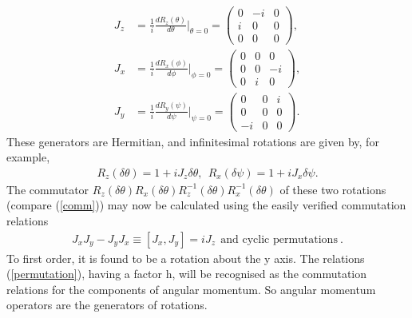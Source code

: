 \documentclass[12pt,a4paper]{report}
\begin{document}
\begin{align}
    J_z&=\frac{1}{i}\frac{dR_z(\theta)}{d\theta}\Bigr|_{\theta=0}=\begin{pmatrix}
    0&-i&0\\
    i&0&0\\
    0&0&0
\end{pmatrix},\\
   J_x&=\frac{1}{i}\frac{dR_x(\phi)}{d\phi}\Bigr|_{\phi=0}=\begin{pmatrix}
    0&0&0\\
    0&0&-i\\
    0&i&0
\end{pmatrix},\\
J_y&=\frac{1}{i}\frac{dR_y(\psi)}{d\psi}\Bigr|_{\psi=0}=\begin{pmatrix}
    0&0&i\\
    0&0&0\\
    -i&0&0
\end{pmatrix}.\label{2.31}
\end{align}
These generators are Hermitian, and infinitesimal rotations are given by, for example, 
\begin{align}
    R_z(\delta\theta)=1+iJ_z\delta\theta,~~R_x(\delta\psi)=1+iJ_x\delta\psi.
\end{align}
The commutator $R_z(\delta\theta)R_x(\delta\theta)R_z^{-1}(\delta\theta)R_x^{-1}(\delta\theta)$ of these two rotations (compare (\eqref{comm})) may now be calculated using the easily verified commutation relations
\begin{align}
    J_xJ_y-J_yJ_x\equiv[J_x,J_y]=iJ_z~~\text{and cyclic permutations}\label{permutation}~.
\end{align}
To first order, it is found to be a rotation about the y axis. The relations (\eqref{permutation}), having a factor h, will be recognised as the commutation relations for the components of angular momentum. So angular momentum operators are the generators of rotations. 
\end{document}
